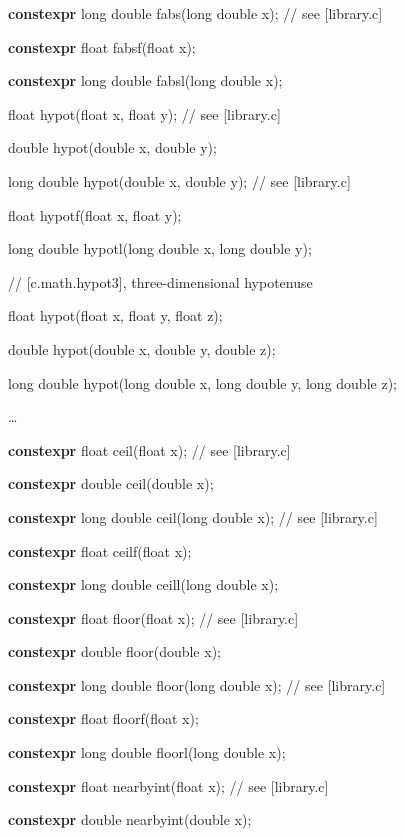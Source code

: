 \documentclass[prd,preprint,amsmath,amssymb,nofootinbib,eqsecnum]{revtex4-1}
\newcommand{\highlight}[1]{{\bf #1}}
\begin{document}
{\highlight{constexpr} long double fabs(long double x); // see [library.c]

\highlight{constexpr} float fabsf(float x);

\highlight{constexpr} long double fabsl(long double x);

\vspace{2ex}

float hypot(float x, float y); // see [library.c]

double hypot(double x, double y);

long double hypot(double x, double y); // see [library.c]

float hypotf(float x, float y);

long double hypotl(long double x, long double y);

\vspace{2ex}

// [c.math.hypot3], three-dimensional hypotenuse

float hypot(float x, float y, float z);

double hypot(double x, double y, double z);

long double hypot(long double x, long double y, long double z);

\ldots

\highlight{constexpr} float ceil(float x); // see [library.c]

\highlight{constexpr} double ceil(double x);

\highlight{constexpr} long double ceil(long double x); // see [library.c]

\highlight{constexpr} float ceilf(float x);

\highlight{constexpr} long double ceill(long double x);

\vspace{2ex}

\highlight{constexpr} float floor(float x); // see [library.c]

\highlight{constexpr} double floor(double x);

\highlight{constexpr} long double floor(long double x); // see [library.c]

\highlight{constexpr} float floorf(float x);

\highlight{constexpr} long double floorl(long double x);

\vspace{2ex}

\highlight{constexpr} float nearbyint(float x); // see [library.c]

\highlight{constexpr} double nearbyint(double x);

}
\end{document}
